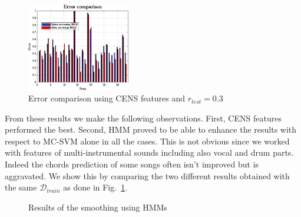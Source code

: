 \begin{figure}[t]
	\centering
	\includegraphics[width=0.4\textwidth]{img/Result_HMM/CENS/plot03071}
	\vspace{-3mm}
	\caption{Error comparison using CENS features and $r_{test}=0.3$}
	\label{fig:compareerror}
	\vspace{-6mm}
\end{figure}
%
 From these results we make the following observations. First, CENS features performed the best. Second, HMM proved to be able to enhance the results with respect to MC-SVM alone in all the cases. This is not obvious since we worked with features of multi-instrumental sounds including also vocal and drum parts. Indeed the chords prediction of some songs often isn't improved but is aggravated. We show this by comparing the two different results obtained with the same $\mathcal{D}_{train}$ as done in Fig.~\ref{fig:compareerror}.
%
\begin{figure}[h!]
	\hfill
	\hfill
	\hfill
	\vspace{-3mm}
	\caption{Results of the smoothing using HMMs}
	\vspace{-6mm}
\end{figure}

